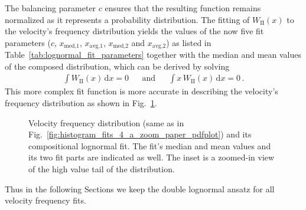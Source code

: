 \documentclass[]{aa}
\begin{document}
        The balancing parameter $c$ ensures that the resulting function remains normalized as it represents a probability distribution.
        The fitting of $W_\text{II}(x)$ to the velocity's frequency distribution yields the values of the now five fit parameters ($c$, $x_\text{med,1}$, $x_\text{avg,1}$, $x_\text{med,2}$ and $x_\text{avg,2}$) as listed in Table~\ref{tab:lognormal_fit_parameters} together with the median and mean values of the composed distribution, which can be derived by solving
        \begin{align}
                \int W_\text{II}(x)\,\text{d}x = 0      &       &\text{and}     &       &\int x\,W_\text{II}(x)\,\text{d}x = 0        \,.
        \end{align}
        This more complex fit function is more accurate in describing the velocity's frequency distribution as shown in Fig.~\ref{fig:histogram_fits_V_a_zoom_dbl_paper_pdfplot}.
        \begin{figure}
                \caption{Velocity frequency distribution (same as in Fig.~\ref{fig:histogram_fits_4_a_zoom_paper_pdfplot}) and its compositional lognormal fit. The fit's median and mean values and its two fit parts are indicated as well. The inset is a zoomed-in view of the high value tail of the distribution.}
                \label{fig:histogram_fits_V_a_zoom_dbl_paper_pdfplot}
        \end{figure}
        Thus in the following Sections we keep the double lognormal ansatz for all velocity frequency fits.
\end{document}

